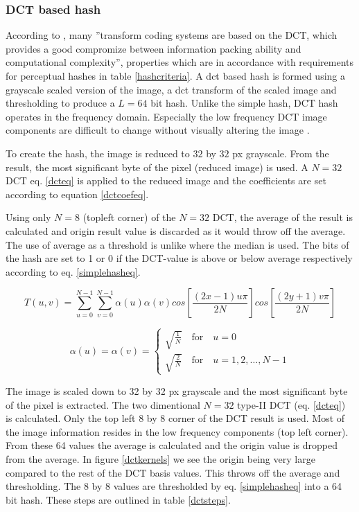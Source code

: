 \documentclass[english,12pt,a4paper,pdftex,elec,utf8]{aaltothesis}
\begin{document}
\subsubsection{DCT based hash}
According to \cite{Gonzalez2002}, many ''transform coding systems are based on the DCT, which provides a good compromize between information packing ability and computational complexity'', properties which are in accordance with requirements for perceptual hashes in table \ref{hashcriteria}. A dct based hash is formed using a grayscale scaled version of the image, a dct transform of the scaled image and thresholding to produce a $L=64$ bit hash. Unlike the simple hash, DCT hash operates in the frequency domain. Especially the low frequency DCT image components are difficult to change without visually altering the image \cite{Fridrich1999}.

To create the hash, the image is reduced to $32$ by $32$ px grayscale. From the result, the most significant byte of the pixel (reduced image) is used. A $N =32$ DCT eq. \ref{dcteq} is applied to the reduced image and the coefficients are set according to equation \ref{dctcoefeq}.


Using only $N = 8$ (topleft corner) of the $N=32$ DCT, the average of the result is calculated and origin result value is discarded as it would throw off the average. The use of average as a threshold is unlike \cite{Coskun2004} where the median is used. The bits of the hash are set to 1 or 0 if the DCT-value is above or below average respectively according to eq. \ref{simplehasheq}.

\begin{equation}\label{dcteq}
T(u,v)= \sum_{u=0}^{N-1} \sum_{v=0}^{N-1}\alpha(u)\alpha(v)cos\left[\frac{(2x-1)u\pi}{2N}\right]cos\left[\frac{(2y + 1)v\pi}{2N}\right]
\end{equation}

\begin{equation}\label{dctcoefeq}
  \alpha(u) = \alpha(v)= \begin{cases}
    \sqrt{\frac{1}{N}} \quad \textrm{for} \quad u=0\\
    \sqrt{\frac{2}{N}} \quad \textrm{for} \quad u=1,2,\ldots,N-1
    \end{cases}
\end{equation}

The image is scaled down to 32 by 32 px grayscale and the most significant byte of the pixel is extracted. The two dimentional $N=32$ type-II DCT (eq. \ref{dcteq}) is calculated. Only the top left 8 by 8 corner of the DCT result is used. Most of the image information resides in the low frequency components (top left corner). From these 64 values the average is calculated and the origin value is dropped from the average. In figure \ref{dctkernels} we see the origin being very large compared to the rest of the DCT basis values. This throws off the average and thresholding. The 8 by 8 values are thresholded by eq. \ref{simplehasheq} into a 64 bit hash. These steps are outlined in table \ref{dctsteps}.
\end{document}
